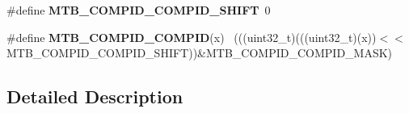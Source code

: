 \begin{DoxyCompactItemize}
\item 
\hypertarget{group___m_t_b___register___masks_ga3511be4cfe57cca4ef93611ab64b624a}{}\#define {\bfseries M\+T\+B\+\_\+\+C\+O\+M\+P\+I\+D\+\_\+\+C\+O\+M\+P\+I\+D\+\_\+\+S\+H\+I\+F\+T}~0\label{group___m_t_b___register___masks_ga3511be4cfe57cca4ef93611ab64b624a}

\item 
\hypertarget{group___m_t_b___register___masks_ga5ee46cf3e3234159be1dceb799e31c88}{}\#define {\bfseries M\+T\+B\+\_\+\+C\+O\+M\+P\+I\+D\+\_\+\+C\+O\+M\+P\+I\+D}(x)                                      ~(((uint32\+\_\+t)(((uint32\+\_\+t)(x))$<$$<$M\+T\+B\+\_\+\+C\+O\+M\+P\+I\+D\+\_\+\+C\+O\+M\+P\+I\+D\+\_\+\+S\+H\+I\+F\+T))\&M\+T\+B\+\_\+\+C\+O\+M\+P\+I\+D\+\_\+\+C\+O\+M\+P\+I\+D\+\_\+\+M\+A\+S\+K)\label{group___m_t_b___register___masks_ga5ee46cf3e3234159be1dceb799e31c88}

\end{DoxyCompactItemize}


\subsection{Detailed Description}

